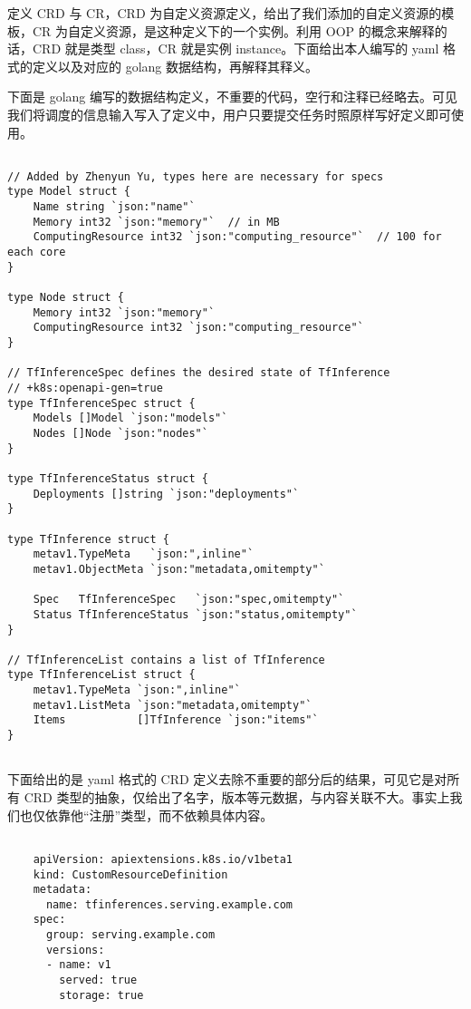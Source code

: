 定义 CRD 与 CR，CRD 为自定义资源定义，给出了我们添加的自定义资源的模板，CR 为自定义资源，是这种定义下的一个实例。利用 OOP 的概念来解释的话，CRD 就是类型 class，CR 就是实例 instance。下面给出本人编写的 yaml 格式的定义以及对应的 golang 数据结构，再解释其释义。

下面是 golang 编写的数据结构定义，不重要的代码，空行和注释已经略去。可见我们将调度的信息输入写入了定义中，用户只要提交任务时照原样写好定义即可使用。

\begin{lstlisting}

// Added by Zhenyun Yu, types here are necessary for specs
type Model struct {
    Name string `json:"name"`
    Memory int32 `json:"memory"`  // in MB
    ComputingResource int32 `json:"computing_resource"`  // 100 for each core
}

type Node struct {
    Memory int32 `json:"memory"`
    ComputingResource int32 `json:"computing_resource"`
}

// TfInferenceSpec defines the desired state of TfInference
// +k8s:openapi-gen=true
type TfInferenceSpec struct {
    Models []Model `json:"models"`
    Nodes []Node `json:"nodes"`
}

type TfInferenceStatus struct {
    Deployments []string `json:"deployments"`
}

type TfInference struct {
    metav1.TypeMeta   `json:",inline"`
    metav1.ObjectMeta `json:"metadata,omitempty"`

    Spec   TfInferenceSpec   `json:"spec,omitempty"`
    Status TfInferenceStatus `json:"status,omitempty"`
}

// TfInferenceList contains a list of TfInference
type TfInferenceList struct {
    metav1.TypeMeta `json:",inline"`
    metav1.ListMeta `json:"metadata,omitempty"`
    Items           []TfInference `json:"items"`
}
    
\end{lstlisting}

下面给出的是 yaml 格式的 CRD 定义去除不重要的部分后的结果，可见它是对所有 CRD 类型的抽象，仅给出了名字，版本等元数据，与内容关联不大。事实上我们也仅依靠他“注册”类型，而不依赖具体内容。

\begin{lstlisting}

    apiVersion: apiextensions.k8s.io/v1beta1
    kind: CustomResourceDefinition
    metadata:
      name: tfinferences.serving.example.com
    spec:
      group: serving.example.com
      versions:
      - name: v1
        served: true
        storage: true

\end{lstlisting}

